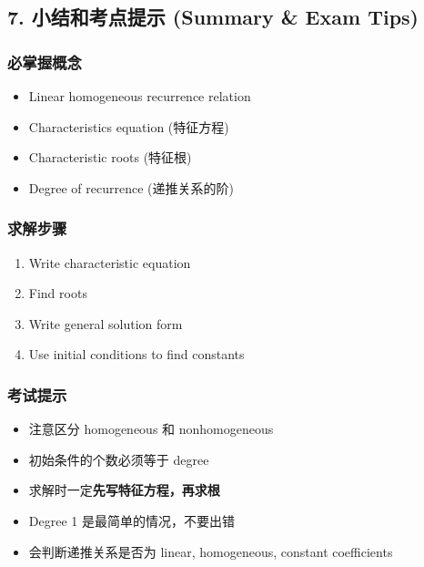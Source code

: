 \documentclass[10pt,a4paper,openany]{ctexbook}
\theoremstyle{definition}
\theoremstyle{remark}
\begin{document}
\vspace{-2pt}

\subsection{7. 小结和考点提示 (Summary \& Exam Tips)}

\subsubsection{必掌握概念}

\begin{itemize}
\item Linear homogeneous recurrence relation
\item Characteristics equation (特征方程)
\item Characteristic roots (特征根)
\item Degree of recurrence (递推关系的阶)

\end{itemize}

\subsubsection{求解步骤}

\begin{enumerate}
\item Write characteristic equation
\item Find roots
\item Write general solution form
\item Use initial conditions to find constants

\end{enumerate}

\subsubsection{考试提示}

\begin{itemize}
\item 注意区分 homogeneous 和 nonhomogeneous
\item 初始条件的个数必须等于 degree
\item 求解时一定\textbf{先写特征方程，再求根}
\item Degree 1 是最简单的情况，不要出错
\item 会判断递推关系是否为 linear, homogeneous, constant coefficients

\end{itemize}
\end{document}
